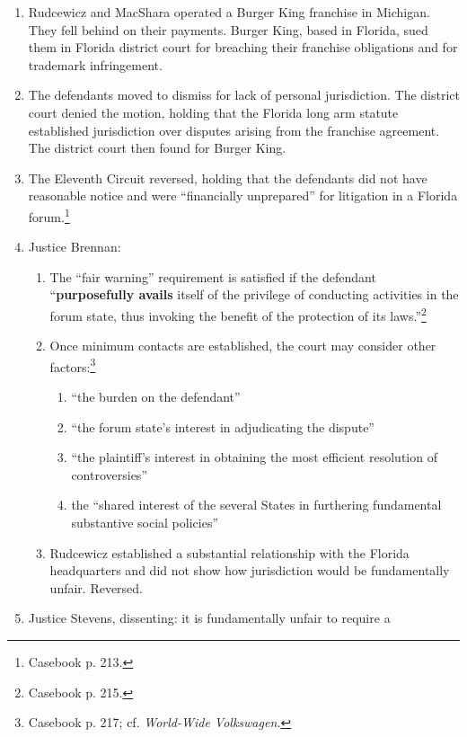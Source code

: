 \begin{enumerate}
    \item Rudcewicz and MacShara operated a Burger King franchise in Michigan.  
    They fell behind on their payments. Burger King, based in Florida, sued 
    them in Florida district court for breaching their franchise obligations 
    and for trademark infringement.
    \item The defendants moved to dismiss for lack of personal jurisdiction.  
    The district court denied the motion, holding that the Florida long arm 
    statute established jurisdiction over disputes arising from the franchise 
    agreement. The district court then found for Burger King.
    \item The Eleventh Circuit reversed, holding that the defendants did not 
    have reasonable notice and were ``financially unprepared'' for litigation 
    in a Florida forum.\footnote{Casebook p. 213.}
    \item Justice Brennan:
    \begin{enumerate}
        \item The ``fair warning'' requirement is satisfied if the defendant 
        ``\textbf{purposefully avails} itself of the privilege of conducting 
        activities in the forum state, thus invoking the benefit of the 
        protection of its laws.''\footnote{Casebook p. 215.}
        \item Once minimum contacts are established, the court may consider 
        other factors:\footnote{Casebook p. 217; cf. \emph{World-Wide 
        Volkswagen.}}
        \begin{enumerate}
            \item ``the burden on the defendant''
            \item ``the forum state's interest in adjudicating the dispute''
            \item ``the plaintiff's interest in obtaining the most efficient 
            resolution of controversies''
            \item the ``shared interest of the several States in furthering 
            fundamental substantive social policies''
        \end{enumerate}
        \item Rudcewicz established a substantial relationship with the 
        Florida headquarters and did not show how jurisdiction would be 
        fundamentally unfair. Reversed.
    \end{enumerate}
    \item Justice Stevens, dissenting: it is fundamentally unfair to require a 

\end{enumerate}
